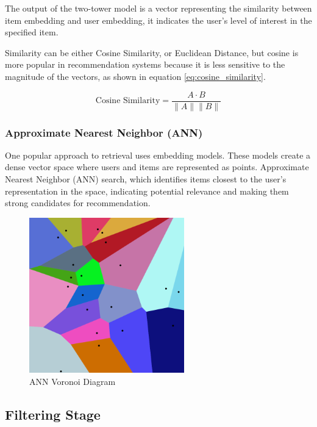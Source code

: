 The output of the two-tower model is a vector representing the similarity between item embedding and user embedding, 
it indicates the user's level of interest in the specified item.

Similarity can be either Cosine Similarity, or Euclidean Distance, but cosine is more popular in recommendation systems because it is less sensitive to the magnitude of the vectors, as shown in equation \ref{eq:cosine_similarity}.

\begin{equation}
    \text{Cosine Similarity} = \frac{A \cdot B}{\|A\| \|B\|}
    \label{eq:cosine_similarity}
\end{equation}


\subsubsection{Approximate Nearest Neighbor (ANN)}

One popular approach to retrieval uses embedding models. 
These models create a dense vector space where users and items are represented as points.
Approximate Nearest Neighbor (ANN) search,
which identifies items closest to the user's representation in the space, 
indicating potential relevance and making them strong candidates for recommendation.


\begin{figure}[H]
    \centering
    \includegraphics[width=0.6\textwidth]{assets/ann.png}
    \caption[ANN Voronoi Diagram]{ANN Voronoi Diagram \cite{AnnVoronoi}}
    \label{fig:AnnVoronoi}
\end{figure}


\subsection{Filtering Stage}

